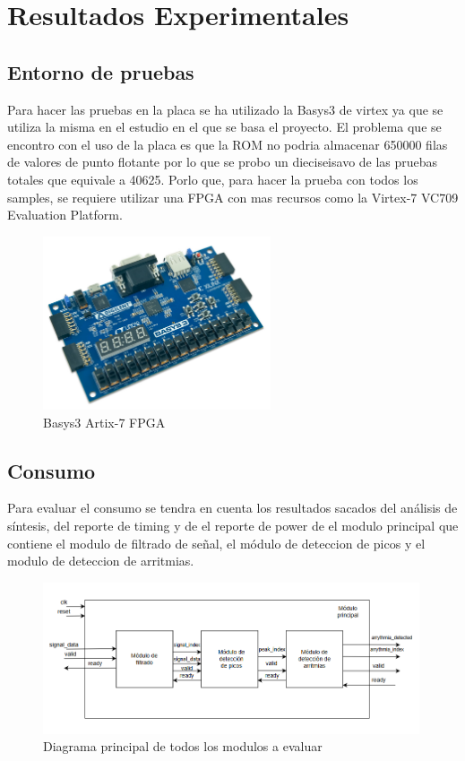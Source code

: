 \chapter{Resultados Experimentales}


\section{Entorno de pruebas}
Para hacer las pruebas en la placa se ha utilizado la Basys3 de virtex ya que se utiliza la misma en el estudio en el que se basa el proyecto.
El problema que se encontro con el uso de la placa es que la ROM no podria almacenar 650000 filas de valores de punto flotante por lo que se probo un dieciseisavo de las pruebas totales que equivale a 40625.
Porlo que, para hacer la prueba con todos los samples, se requiere utilizar una FPGA con mas recursos como la Virtex-7 VC709 Evaluation Platform.

\begin{figure}[h]
	\centering
	\includegraphics[width=0.6\textwidth]{./Images/img_introduccion/Basys3.jpg}
	\caption{Basys3 Artix-7 FPGA}
	\label{fig:Basys3}
\end{figure}

\section{Consumo}
	Para evaluar el consumo se tendra en cuenta los resultados sacados del análisis de síntesis, del reporte de timing y de el reporte de power de el modulo principal que contiene el modulo de filtrado de señal,
	el módulo de deteccion de picos y el modulo de deteccion de arritmias. 
	
	\begin{figure}[h!]
		\centering
		\includegraphics[width=0.99\textwidth]{./Images/img_res_experimentales/diagramaGeneral.png}
		\caption{Diagrama principal de todos los modulos a evaluar}
		\label{fig:Diagramaasmfiltrado}
	\end{figure} 

